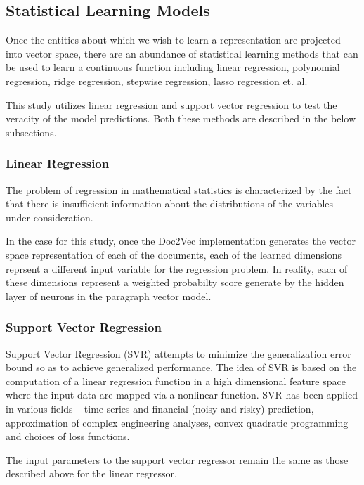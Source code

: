 \documentclass[conference]{IEEEtran}
\begin{document}
    \subsection{Statistical Learning Models}
        Once the entities about which we wish to learn a representation are projected into vector space, there are an abundance of statistical learning methods that can be used to learn a continuous function including linear regression, polynomial regression, ridge regression, stepwise regression, lasso regression et. al.

        This study utilizes linear regression and support vector regression to test the veracity of the model predictions. Both these methods are described in the below subsections.

    \subsubsection{Linear Regression}
        The problem of regression in mathematical statistics is characterized by the fact that there is insufficient information about the distributions of the variables under consideration\cite{regression_analysis}.

        In the case for this study, once the Doc2Vec implementation generates the vector space representation of each of the documents, each of the learned dimensions reprsent a different input variable for the regression problem. In reality, each of these dimensions represent a weighted probabilty score generate by the hidden layer of neurons in the paragraph vector model.

    \subsubsection{Support Vector Regression}
        Support Vector Regression (SVR) attempts to minimize the generalization error bound so as to achieve generalized performance. The idea of SVR is based on the computation of a linear regression function in a high dimensional feature space where the input data are mapped via a nonlinear function. SVR has been applied in various fields – time series and financial (noisy and risky) prediction, approximation of complex engineering analyses, convex quadratic programming and choices of loss functions\cite{basak2007support}.

        The input parameters to the support vector regressor remain the same as those described above for the linear regressor.
\end{document}
